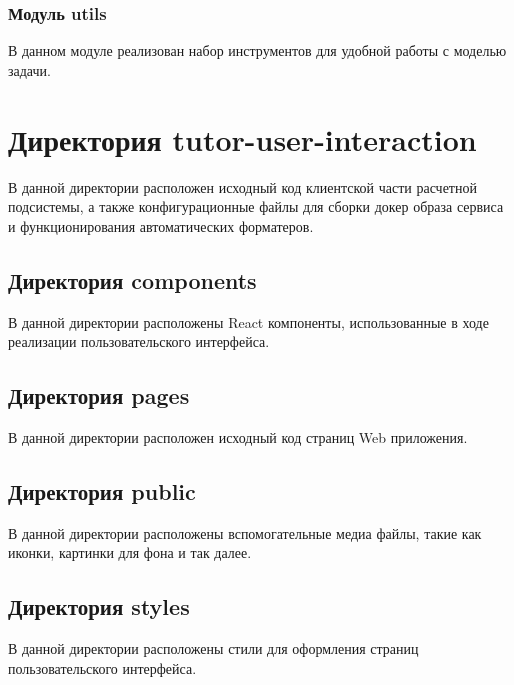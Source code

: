 \documentclass[a4paper,12pt]{article}
\begin{document}
    \subsubsection{Модуль utils}
    В данном модуле реализован набор инструментов для удобной работы с моделью задачи.


    \section{Директория tutor-user-interaction}
    В данной директории расположен исходный код клиентской части расчетной подсистемы, а также конфигурационные файлы для сборки докер образа сервиса и функционирования автоматических форматеров.

    \subsection{Директория components}
    В данной директории расположены React компоненты, использованные в ходе реализации пользовательского интерфейса.

    \subsection{Директория pages}
    В данной директории расположен исходный код страниц Web приложения.

    \subsection{Директория public}
    В данной директории расположены вспомогательные медиа файлы, такие как иконки, картинки для фона и так далее.

    \subsection{Директория styles}
    В данной директории расположены стили для оформления страниц пользовательского интерфейса.


    \newpage
    \listRegistration
\end{document}
